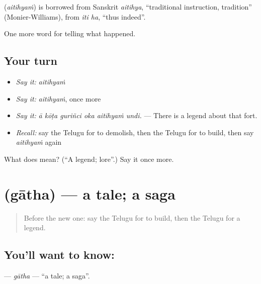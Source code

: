 \begin{cousinweb}
\textbf{} (\emph{aitihyaṁ}) is borrowed from Sanskrit \emph{aitihya}, \textquotedblleft{}traditional instruction, tradition\textquotedblright{} (Monier-Williams), from \emph{iti ha}, \textquotedblleft{}thus indeed\textquotedblright{}.
\end{cousinweb}

\begin{grammarlens}[title={What you've built}]
One more word for telling what happened.
\end{grammarlens}

\subsection*{Your turn}
\begin{itemize}
\raggedright
  \item \emph{Say it:} \emph{aitihyaṁ}
  \item \emph{Say it:} \emph{aitihyaṁ}, once more
  \item \emph{Say it:} \emph{ā kōṭa guriñci oka aitihyaṁ undi.} — There is a legend about that fort.
  \item \emph{Recall:} say the Telugu for to demolish, then the Telugu for to build, then say \emph{aitihyaṁ} again
\end{itemize}

\begin{tcolorbox}[breakable,colback=teal!4,colframe=teal!35!black,title={Before you move on}]
What does  mean? (\textquotedblleft{}A legend; lore\textquotedblright{}.) Say it once more.
\end{tcolorbox}
\section[\texorpdfstring{\te{గాథ} (gātha)}{గాథ (gātha)}]{ (gātha) — a tale; a saga}

\label{lesson:TE-C370-gatha}



\begin{quote}
Before the new one: say the Telugu for to build, then the Telugu for a legend.
\end{quote}

\subsection*{You'll want to know: }
\textbf{} — \emph{gātha} — \textquotedblleft{}a tale; a saga\textquotedblright{}.

